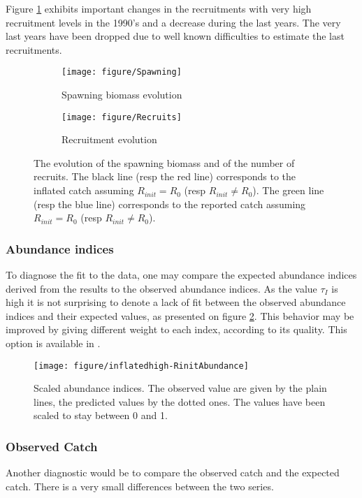 Figure \ref{fig:recruits} exhibits important changes in the recruitments with very high recruitment levels in the 1990's and a decrease during the last years. The very last years have been dropped due to well known difficulties to estimate the last recruitments.

\begin{figure}
 \begin{subfigure}[b]{0.45\textwidth}
  \texttt{[image: figure/Spawning]} 
  \caption{Spawning biomass evolution}
  \end{subfigure}\hfill
 \begin{subfigure}[b]{0.45\textwidth}
  \texttt{[image: figure/Recruits]} 
	\caption{Recruitment evolution}
  \end{subfigure}
\caption{The evolution of the spawning biomass and of the number of recruits.
The black line (resp the red line) corresponds to the inflated catch assuming $R_{init}=R_0$ (resp $R_{init}\ne R_0$).   
The green line (resp the blue line) corresponds to the reported catch assuming $R_{init}=R_0$ (resp $R_{init}\ne R_0$). }
\label{fig:recruits}
\end{figure}


\subsubsection{Abundance indices}
To diagnose the fit to the data, one may compare the expected abundance indices derived from the results to the observed abundance indices.
As the value $\tau_I$ is high it is not surprising to denote a lack of fit between the observed abundance indices and their  expected values, as presented on figure \ref{fig:abundance}.
This behavior may be improved by giving different weight to each index, according to its quality. This option is available in \iscam.



\begin{figure}[htbp]
  \texttt{[image: figure/inflatedhigh-RinitAbundance]} 
  \caption{Scaled  abundance indices. The observed value are given by the plain lines, the predicted values by the dotted ones. The values have been scaled to stay between 0 and 1.}
  \label{fig:abundance}
\end{figure}

\subsubsection{Observed Catch}
Another diagnostic would be to compare the observed catch and the expected catch. 
There is a very small differences between the two series. 

